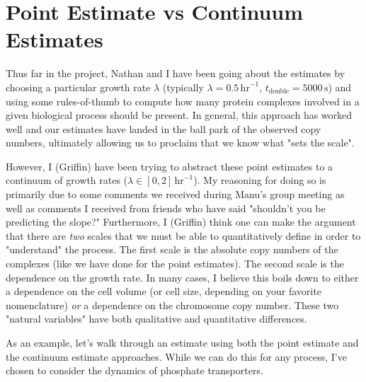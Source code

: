 \documentclass[letterpaper, 10pt]{article}
\begin{document}
\section*{Point Estimate vs Continuum Estimates}
Thus far in the project, Nathan and I have been going about the estimates by
choosing a particular growth rate $\lambda$ (typically $\lambda = 0.5\,
\text{hr}^{-1}$, $t_\text{double} = 5000 \,\text{s}$) and using some
rules-of-thumb to compute how many protein complexes involved in a given
biological process should be present. In general, this approach has worked well
and our estimates have landed in the ball park of the observed copy numbers,
ultimately allowing us to proclaim that we know what "sets the scale".

However, I (Griffin) have been trying to abstract these point estimates to a
continuum of growth rates ($\lambda \in [0, 2]\, \text{hr}^{-1}$). My reasoning
for doing so is primarily due to some comments we received during Manu's group
meeting as well as comments I received from friends who have said "shouldn't you
be predicting the slope?" Furthermore, I (Griffin) think one can make the
argument that there are \textit{two} scales that we must be able to
quantitatively define in order to "understand" the process. The first scale is
the absolute copy numbers of the complexes (like we have done for the point
estimates). The second scale is the dependence on the growth rate. In many
cases, I believe this boils down to either a dependence on the cell volume (or
cell size, depending on your favorite nomenclature) \textit{or} a dependence on
the chromosome copy number. These two "natural variables" have both qualitative
and quantitative differences. 

As an example, let's walk through an estimate using both the point estimate and
the continuum estimate approaches. While we can do this for any process, I've
chosen to consider the dynamics of phosphate transporters.
\end{document}
